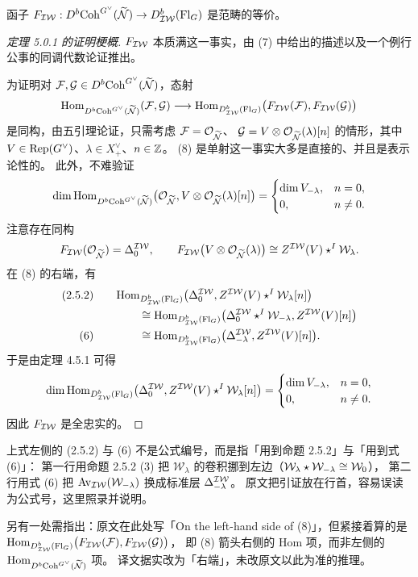 \begin{theorem}\label{thm:main}
函子 $F_{\mathcal{IW}}:D^b\mathrm{Coh}^{G^\vee}(\widetilde{\mathcal{N}})\to D^b_{\mathcal{IW}}(\mathrm{Fl}_G)$ 是范畴的等价。
\end{theorem}

\begin{proof}[定理 5.0.1 的证明梗概]
$F_{\mathcal{IW}}$ 本质满这一事实，由 (7) 中给出的描述以及一个例行公事的同调代数论证推出。

为证明对 $\mathcal{F},\mathcal{G}\in D^b\mathrm{Coh}^{G^\vee}(\widetilde{\mathcal{N}})$，态射
\begin{equation}
\mathrm{Hom}_{D^b\mathrm{Coh}^{G^\vee}(\widetilde{\mathcal{N}})}(\mathcal{F},\mathcal{G})
\longrightarrow
\mathrm{Hom}_{D^b_{\mathcal{IW}}(\mathrm{Fl}_G)}\bigl(F_{\mathcal{IW}}(\mathcal{F}),F_{\mathcal{IW}}(\mathcal{G})\bigr)
\end{equation}
是同构，由五引理论证，只需考虑 $\mathcal{F}=\mathcal{O}_{\widetilde{\mathcal{N}}}$、
$\mathcal{G}=V\otimes\mathcal{O}_{\widetilde{\mathcal{N}}}(\lambda)[n]$ 的情形，其中 $V\in\mathrm{Rep}(G^\vee)$、$\lambda\in X^\vee_+$、$n\in\mathbb{Z}$。
(8) 是单射这一事实大多是直接的、并且是表示论性的。
此外，不难验证
\[
\dim\mathrm{Hom}_{D^b\mathrm{Coh}^{G^\vee}(\widetilde{\mathcal{N}})}\bigl(\mathcal{O}_{\widetilde{\mathcal{N}}},V\otimes\mathcal{O}_{\widetilde{\mathcal{N}}}(\lambda)[n]\bigr)
=\begin{cases}
\dim V_{-\lambda}, & n=0,\\
0, & n\neq0.
\end{cases}
\]
注意存在同构
\[
F_{\mathcal{IW}}(\mathcal{O}_{\widetilde{\mathcal{N}}})=\Delta^{\mathcal{IW}}_0,
\qquad
F_{\mathcal{IW}}\bigl(V\otimes\mathcal{O}_{\widetilde{\mathcal{N}}}(\lambda)\bigr)\cong Z^{\mathcal{IW}}(V)\star^{I}\mathcal{W}_\lambda .
\]
在 (8) 的右端，有
\begin{align}
(2.5.2)\qquad
&\mathrm{Hom}_{D^b_{\mathcal{IW}}(\mathrm{Fl}_G)}\bigl(\Delta^{\mathcal{IW}}_0,Z^{\mathcal{IW}}(V)\star^{I}\mathcal{W}_\lambda[n]\bigr)
\notag\\
&\qquad\cong
\mathrm{Hom}_{D^b_{\mathcal{IW}}(\mathrm{Fl}_G)}\bigl(\Delta^{\mathcal{IW}}_0\star^{I}\mathcal{W}_{-\lambda},Z^{\mathcal{IW}}(V)[n]\bigr)
\notag\\
(6)\qquad
&\qquad\cong
\mathrm{Hom}_{D^b_{\mathcal{IW}}(\mathrm{Fl}_G)}\bigl(\Delta^{\mathcal{IW}}_{-\lambda},Z^{\mathcal{IW}}(V)[n]\bigr).
\notag
\end{align}
于是由定理 4.5.1 可得
\[
\dim\mathrm{Hom}_{D^b_{\mathcal{IW}}(\mathrm{Fl}_G)}\bigl(\Delta^{\mathcal{IW}}_0,Z^{\mathcal{IW}}(V)\star^{I}\mathcal{W}_\lambda[n]\bigr)
=\begin{cases}
\dim V_{-\lambda}, & n=0,\\
0, & n\neq0.
\end{cases}
\]
因此 $F_{\mathcal{IW}}$ 是全忠实的。
\end{proof}

\begin{yizhu}
上式左侧的 (2.5.2) 与 (6) 不是公式编号，而是指「用到命题 2.5.2」与「用到式 (6)」：
第一行用命题 2.5.2 (3) 把 $\mathcal{W}_\lambda$ 的卷积挪到左边（$\mathcal{W}_\lambda\star\mathcal{W}_{-\lambda}\cong\mathcal{W}_0$），
第二行用式 (6) 把 $\mathrm{Av}_{\mathcal{IW}}(\mathcal{W}_{-\lambda})$ 换成标准层 $\Delta^{\mathcal{IW}}_{-\lambda}$。
原文把引证放在行首，容易误读为公式号，这里照录并说明。

另有一处需指出：原文在此处写「On the left-hand side of (8)」，但紧接着算的是
$\mathrm{Hom}_{D^b_{\mathcal{IW}}(\mathrm{Fl}_G)}\bigl(F_{\mathcal{IW}}(\mathcal{F}),F_{\mathcal{IW}}(\mathcal{G})\bigr)$，
即 (8) 箭头右侧的 $\mathrm{Hom}$ 项，而非左侧的 $\mathrm{Hom}_{D^b\mathrm{Coh}^{G^\vee}(\widetilde{\mathcal{N}})}$ 项。
译文据实改为「右端」，未改原文以此为准的推理。
\end{yizhu}

